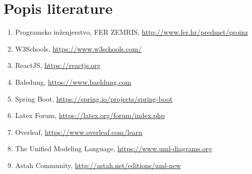\chapter*{Popis literature}
	 	
		
		
		\begin{enumerate}
			
			
			\item  Programsko inženjerstvo, FER ZEMRIS, \url{http://www.fer.hr/predmet/proinz}
			
			\item W3Schools, \url{https://www.w3schools.com/}
			
			\item ReactJS, \url{https://reactjs.org}
			
			\item Baledung, \url{https://www.baeldung.com}
			
			\item  Spring Boot, \url{https://spring.io/projects/spring-boot}
			
			\item  Latex Forum, \url{https://latex.org/forum/index.php}
			
			\item  Overleaf, \url{https://www.overleaf.com/learn}
			
			\item  The Unified Modeling Language, \url{https://www.uml-diagrams.org}
			
			\item  Astah Community, \url{http://astah.net/editions/uml-new}
		\end{enumerate}
		
		 
